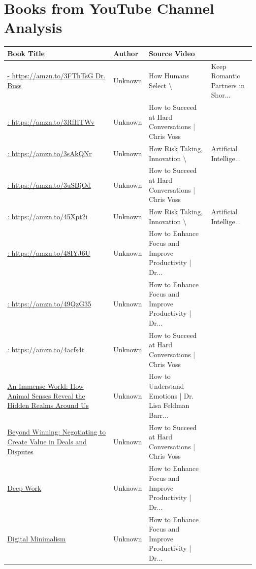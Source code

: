 \documentclass{article}
\begin{document}
\section{Books from YouTube Channel Analysis}

\begin{longtable}{|p{6cm}|p{4cm}|p{4cm}|}
\hline
\textbf{Book Title} & \textbf{Author} & \textbf{Source Video} \\
\hline
\href{https://amzn.to/3FThTsG}{- https://amzn.to/3FThTsG
Dr. Buss} & Unknown & How Humans Select \textbackslash{}& Keep Romantic Partners in Shor... \\
\hline
\href{https://amzn.to/3uSBjOd}{: https://amzn.to/3RfHTWv} & Unknown & How to Succeed at Hard Conversations | Chris Voss \\
\hline
\href{https://amzn.to/3sAkQNr}{: https://amzn.to/3sAkQNr} & Unknown & How Risk Taking, Innovation \textbackslash{}& Artificial Intellige... \\
\hline
\href{https://amzn.to/3uSBjOd}{: https://amzn.to/3uSBjOd} & Unknown & How to Succeed at Hard Conversations | Chris Voss \\
\hline
\href{https://amzn.to/3sAkQNr}{: https://amzn.to/45Xpt2i} & Unknown & How Risk Taking, Innovation \textbackslash{}& Artificial Intellige... \\
\hline
\href{https://amzn.to/3wNR6yV}{: https://amzn.to/48IYJ6U} & Unknown & How to Enhance Focus and Improve Productivity | Dr... \\
\hline
\href{https://amzn.to/3wNR6yV}{: https://amzn.to/49QzG35} & Unknown & How to Enhance Focus and Improve Productivity | Dr... \\
\hline
\href{https://amzn.to/4acfs4t}{: https://amzn.to/4acfs4t} & Unknown & How to Succeed at Hard Conversations | Chris Voss \\
\hline
\href{https://amzn.to/3rUQyVO}{An Immense World: How Animal Senses Reveal the Hidden Realms Around Us} & Unknown & How to Understand Emotions | Dr. Lisa Feldman Barr... \\
\hline
\href{https://amzn.to/3RfHTWv}{Beyond Winning: Negotiating to Create Value in Deals and Disputes} & Unknown & How to Succeed at Hard Conversations | Chris Voss \\
\hline
\href{https://amzn.to/49QzG35}{Deep Work} & Unknown & How to Enhance Focus and Improve Productivity | Dr... \\
\hline
\href{https://amzn.to/49QzG35}{Digital Minimalism} & Unknown & How to Enhance Focus and Improve Productivity | Dr... \\

\end{longtable}
\end{document}
